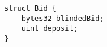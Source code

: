 \begin{lstlisting}[language=Solidity]
struct Bid {
	bytes32 blindedBid;
	uint deposit;
}
\end{lstlisting}